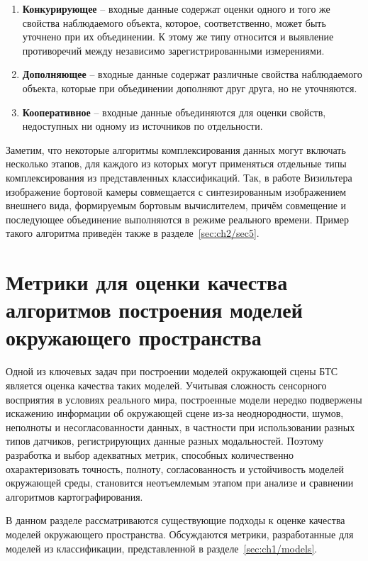 \begin{enumerate}
	\item \textbf{Конкурирующее} -- входные данные содержат оценки одного и того же свойства наблюдаемого объекта, которое, соответственно, может быть уточнено при их объединении. К этому же типу относится и выявление противоречий между независимо зарегистрированными измерениями.
	\item \textbf{Дополняющее} -- входные данные содержат различные свойства наблюдаемого объекта, которые при объединении дополняют друг друга, но не уточняются.
	\item \textbf{Кооперативное} -- входные данные объединяются для оценки свойств, недоступных ни одному из источников по отдельности.
\end{enumerate}

Заметим, что некоторые алгоритмы комплексирования данных могут включать несколько этапов, для каждого из которых могут применяться отдельные типы комплексирования из представленных классификаций. Так, в работе Визильтера~\autocite{vygolov2014realtime} изображение бортовой камеры совмещается с синтезированным изображением внешнего вида, формируемым бортовым вычислителем, причём совмещение и последующее объединение выполняются в режиме реального времени. Пример такого алгоритма приведён также в разделе~\cref{sec:ch2/sec5}.

\section{Метрики для оценки качества алгоритмов построения моделей окружающего пространства}\label{sec:ch1/metrics}

Одной из ключевых задач при построении моделей окружающей сцены БТС является оценка качества таких моделей. Учитывая сложность сенсорного восприятия в условиях реального мира, построенные модели нередко подвержены искажению информации об окружающей сцене из-за неоднородности, шумов, неполноты и несогласованности данных, в частности при использовании разных типов датчиков, регистрирующих данные разных модальностей. Поэтому разработка и выбор адекватных метрик, способных количественно охарактеризовать точность, полноту, согласованность и устойчивость моделей окружающей среды, становится неотъемлемым этапом при анализе и сравнении алгоритмов картографирования.

В данном разделе рассматриваются существующие подходы к оценке качества моделей окружающего пространства. Обсуждаются метрики, разработанные для моделей из классификации, представленной в разделе~\cref{sec:ch1/models}.

